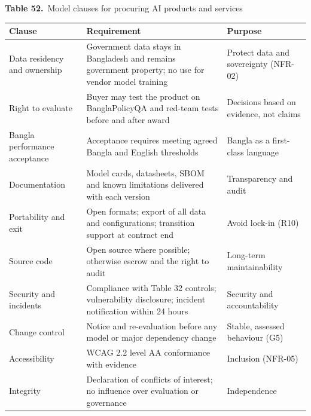 \documentclass[border=10pt]{standalone}
\begin{document}
\begin{minipage}{17cm}
{\large\bfseries Table 52.}\ {\large Model clauses for procuring AI products and services}\par\vspace{7pt}
\small
{}
\begin{tabularx}{\linewidth}{@{}>{\hsize=0.732\hsize\raggedright\arraybackslash}X>{\hsize=1.317\hsize\raggedright\arraybackslash}X>{\hsize=0.951\hsize\raggedright\arraybackslash}X@{}}
\arrayrulecolor{bapilrule}\toprule
\rowcolor{white}\textbf{Clause} & \textbf{Requirement} & \textbf{Purpose} \\
\midrule
Data residency and ownership & Government data stays in Bangladesh and remains government property; no use for vendor model training & Protect data and sovereignty (NFR-02) \\
Right to evaluate & Buyer may test the product on BanglaPolicyQA and red-team tests before and after award & Decisions based on evidence, not claims \\
Bangla performance acceptance & Acceptance requires meeting agreed Bangla and English thresholds & Bangla as a first-class language \\
Documentation & Model cards, datasheets, SBOM and known limitations delivered with each version & Transparency and audit \\
Portability and exit & Open formats; export of all data and configurations; transition support at contract end & Avoid lock-in (R10) \\
Source code & Open source where possible; otherwise escrow and the right to audit & Long-term maintainability \\
Security and incidents & Compliance with Table 32 controls; vulnerability disclosure; incident notification within 24 hours & Security and accountability \\
Change control & Notice and re-evaluation before any model or major dependency change & Stable, assessed behaviour (G5) \\
Accessibility & WCAG 2.2 level AA conformance with evidence & Inclusion (NFR-05) \\
Integrity & Declaration of conflicts of interest; no influence over evaluation or governance & Independence \\
\bottomrule
\end{tabularx}
\par{}
\end{minipage}
\end{document}
